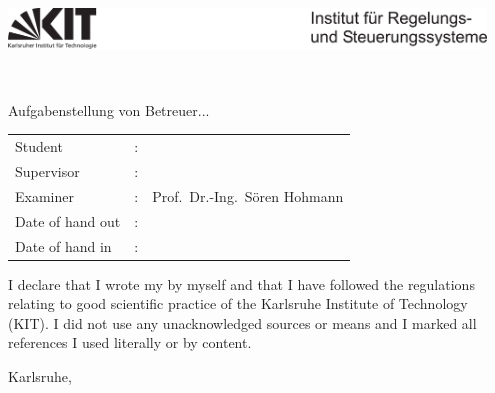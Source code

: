 \thispagestyle{empty}
\hspace{0.5cm}
\includegraphics[width=0.95\textwidth]{03_images/title_page/kitlogo_irs.pdf}

\vspace{1cm}

\centerline{\LARGE \textsf{\textbf{\artderarbeit{}\ \nummerderarbeit}}} %

\vspace{1cm}

\begin{center}
	\Huge \textsf{\textbf{\titelderarbeit}}
\end{center}

\vspace{1cm}
\sffamily
Aufgabenstellung von Betreuer...

\vspace{6.5cm} %


\begin{tabular}{lcl}
	Student &:& \student\addWithPreCommaSpace{\studentgrad} \\
	Supervisor &:& \betreuer\addWithPreCommaSpace{\betreuergrad} \\
	Examiner &:& Prof.\ Dr.-Ing.\ Sören Hohmann \\
	Date of hand out &:& \ausgabe \\
	Date of hand in &:& \abgabe
\end{tabular}

\vspace{0.25cm}

I declare that I wrote my \artderarbeit{} by myself and that I have followed the regulations relating to good scientific practice of the Karlsruhe Institute of Technology (KIT). I did not use any unacknowledged sources or means and I marked all references I used literally or by content.

\vspace{0.5cm}

Karlsruhe, \abgabe

\vspace{1.4cm}

\student\addWithPreCommaSpace{\studentgrad}
\rmfamily
